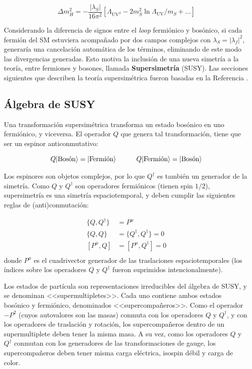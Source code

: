\begin{equation}
	\Delta m_H^2 = - \frac{|\lambda_S|}{16 \pi^2}\left[\Lambda_{\text{UV}^2} - 2m_S^2 \ln{\Lambda_{\text{UV}}/m_S} + ... \right]
\end{equation}

Considerando la diferencia de signos entre el \textit{loop} fermiónico y bosónico, si cada fermión del SM estuviera acompañado por dos campos complejos con $\lambda_S = |\lambda_f|^2$, generaría una cancelación automática de los términos, eliminando de este modo las divergencias generadas. Esto motiva la inclusión de una nueva simetría a la teoría, entre fermiones y bosones, llamada \textbf{Supersimetría} (SUSY). Las secciones siguientes que describen la teoría supersimétrica fueron basadas en la Referencia \cite{Martin:1997ns}.

\subsection{Álgebra de SUSY}

Una transformación supersimétrica transforma un estado bosónico en uno fermiónico, y viceversa. El operador $Q$ que genera tal transformación, tiene que ser un espinor anticonmutativo:

\begin{equation}
	Q\lvert\text{Bosón}\rangle = \lvert\text{Fermión}\rangle \quad\quad\quad Q\lvert\text{Fermión}\rangle = \lvert\text{Bosón}\rangle
\end{equation}

Los espinores son objetos complejos, por lo que $Q^{\dagger}$ es también un generador de la simetría. Como $Q$ y $Q^{\dagger}$ son operadores fermiónicos (tienen spin $1/2$), supersimetría es una simetría espaciotemporal, y deben cumplir las siguientes reglas de (anti)conmutación:

\begin{equation}
	\begin{split}	
		\{Q,Q^{\dagger}\} & = P^{\mu}\\
		\{Q,Q\} & = \{Q^{\dagger},Q^{\dagger}\} = 0\\
		[P^{\mu},Q] & = [P^{\mu},Q^{\dagger}] = 0\\
	\end{split}	
\end{equation}
%
donde $P^{\mu}$ es el cuadrivector generador de las traslaciones espaciotemporales (los índices sobre los operadores $Q$ y $Q^{\dagger}$ fueron suprimidos intencionalmente).


Los estados de partícula son representaciones irreducibles del álgebra de SUSY, y se denominan <<supermultipletes>>. Cada uno contiene ambos estados bosónico y fermiónico, denominados <<supercompañeros>>. Como el operador $-P^2$ (cuyos autovalores son las masas) conmuta con los operadores $Q$ y $Q^{\dagger}$, y con los operadores de traslación y rotación, los supercompañeros dentro de un supermultiplete deben tener la misma masa. A su vez, como los operadores $Q$ y $Q^{\dagger}$ conmutan con los generadores de las transformaciones de gauge, los supercompañeros deben tener misma carga eléctrica, isospin débil y carga de color.


